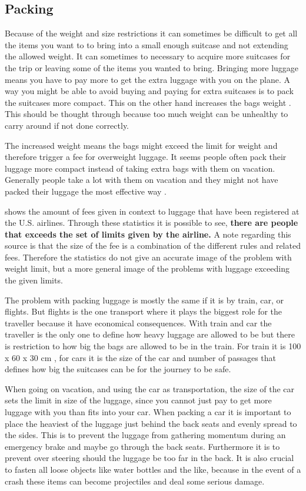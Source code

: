 \subsection*{Packing}

Because of the weight and size restrictions it can sometimes be difficult to get all the items you want to to bring into a small enough suitcase and not extending the allowed weight. It can sometimes to necessary to acquire more suitcases for the trip or leaving some of the items you wanted to bring. 
Bringing more luggage means you have to pay more to get the extra luggage with you on the plane. A way you might be able to avoid buying and paying for extra suitcases is to pack the suitcases more compact. This on the other hand increases the bags weight \citep{altombag}. This should be thought through because too much weight can be unhealthy to carry around if not done correctly. 

The increased weight means the bags might exceed the limit for weight and therefore trigger a fee for overweight luggage.
It seems people often pack their luggage more compact instead of taking extra bags with them on vacation. Generally people take a lot with them on vacation and they might not have packed their luggage the most effective way \citep{airstat}.

\citep{airstat} shows the amount of fees given in context to luggage that have been registered at the U.S. airlines. Through these statistics it is possible to see, \textbf{there are people that exceeds the set of limits given by the airline.} A note regarding this source is that the size of the fee is a combination of the different rules and related fees. Therefore the statistics do not give an accurate image of the problem with weight limit, but a more general image of the problems with luggage exceeding the given limits.

The problem with packing luggage is mostly the same if it is by train, car, or flights. But flights is the one transport where it plays the biggest role for the traveller because it have economical consequences. With train and car the traveller is the only one to define how heavy luggage are allowed to be but there is restriction to how big the bags are allowed to be in the train. For train it is 100 x 60 x 30 cm \citep{rulestrain}, for cars it is the size of the car and number of passages that defines how big the suitcases can be for the journey to be safe.

When going on vacation, and using the car as transportation, the size of the car sets the limit in size of the luggage, since you cannot just pay to get more luggage with you than fits into your car. When packing a car it is important to place the heaviest of the luggage just behind the back seats and evenly spread to the sides. This is to prevent the luggage from gathering momentum during an emergency brake and maybe go through the back seats. Furthermore it is to prevent over steering should the luggage be too far in the back. It is also crucial to fasten all loose objects like water bottles and the like, because in the event of a crash these items can become projectiles and deal some serious damage\citep{Farlig_bagage}.

